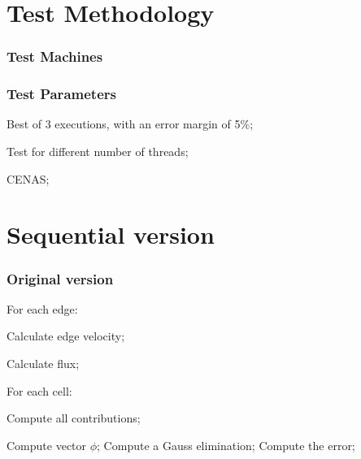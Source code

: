 \documentclass{beamer}
\begin{document}
\section{Test Methodology}
\begin{frame}[plain]
	\frametitle{Test Machines}
		\begin{center}

			\begin{table}[!htp]
			\caption{Test cases}
			\label{tab:testcases}
			\end{table}
		\end{center}
\end{frame}

\begin{frame}[plain]
	\frametitle{Test Parameters}
	\begin{description}
		\item Best of 3 executions, with an error margin of 5\%;
		\item Test for different number of threads;
		\item CENAS;
	\end{description}
\end{frame}


\section{Sequential version}
\begin{frame}
	\frametitle{Original version}
	For each edge:
	\begin{description}
		\item Calculate edge velocity;
		\item Calculate flux;
	\end{description}
	For each cell:
	\begin{description}
		\item Compute all contributions;
	\end{description}
	Compute vector $\phi$;
	Compute a Gauss elimination;
	Compute the error;
\end{frame}
\end{document}

